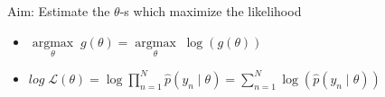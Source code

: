 \documentclass[landscape, a4paper]{article}
\begin{document}
\begin{minipage}[t]{0.2\linewidth}
\begin{betterlist}
\begin{betterlist}
\begin{itemize}
			\end{itemize}
			\item \alert{Aim:} Estimate the $\theta$-s which maximize the likelihood
			\begin{itemize}
				\item $\underset{\theta}{\operatorname{argmax}}\;g(\theta)=\underset{\theta}{\operatorname{argmax}}\;\log (g(\theta))$
				\item $\displaystyle log\;\mathcal{L}(\theta) = \log \prod_{n=1}^N \hat{p}\left(y_n \mid \theta\right)=\sum_{n=1}^N \log \left(\hat{p}\left(y_n \mid \theta\right)\right)$
			\end{itemize}
		\end{betterlist}
	\end{betterlist}
\end{minipage}
\begin{minipage}[t]{0.2\linewidth}
\end{minipage}
\begin{minipage}[t]{0.2\linewidth}
\end{minipage}
\begin{minipage}[t]{0.2\linewidth}
\end{minipage}
\begin{minipage}[t]{0.2\linewidth}
\end{minipage}

\newpage

\begin{minipage}[t]{0.2\linewidth}
\end{minipage}
\begin{minipage}[t]{0.2\linewidth}
\end{minipage}
\begin{minipage}[t]{0.2\linewidth}
\end{minipage}
\begin{minipage}[t]{0.2\linewidth}
\end{minipage}
\begin{minipage}[t]{0.2\linewidth}
\end{minipage}
\end{document}
